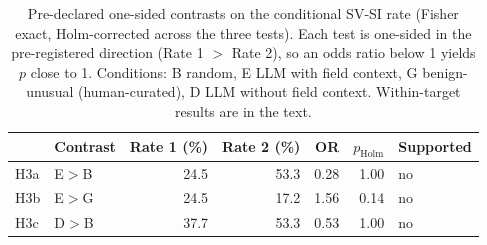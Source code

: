 \begin{table}[t]
\caption{Pre-declared one-sided contrasts on the conditional SV-SI rate (Fisher exact, Holm-corrected
across the three tests). Each test is one-sided in the pre-registered direction (Rate 1 $>$ Rate 2), so
an odds ratio below 1 yields $p$ close to 1. Conditions: B random, E LLM with field context,
G benign-unusual (human-curated), D LLM without field context. Within-target results are in the text.}
\label{tab:contrasts}
\centering
\footnotesize
\setlength{\tabcolsep}{3pt}
\begin{tabular}{llrrrrl}
\toprule
 & Contrast & Rate 1 (\%) & Rate 2 (\%) & OR & $p_{\mathrm{Holm}}$ & Supported \\
\midrule
H3a & E$>$B & 24.5 & 53.3 & 0.28 & 1.00 & no \\
H3b & E$>$G & 24.5 & 17.2 & 1.56 & 0.14 & no \\
H3c & D$>$B & 37.7 & 53.3 & 0.53 & 1.00 & no \\
\bottomrule
\end{tabular}
\end{table}
